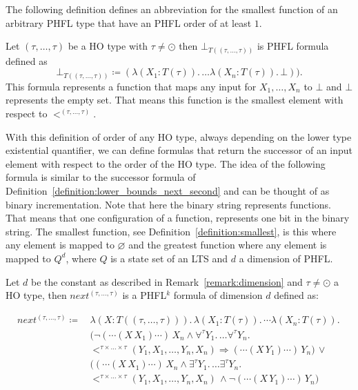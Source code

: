 The following definition defines an abbreviation for the smallest function of an arbitrary PHFL type that have an PHFL order of at least $1$.

\begin{definition} 
\label{definition:smallest}
	Let $(\tau, \dots, \tau)$ be a HO type with $\tau \neq \odot$ then $\bot_{T((\tau, \dots, \tau))}$ is PHFL formula defined as
	\[\bot_{T((\tau, \dots, \tau))} \coloneqq (\lambda (X_1 \colon T(\tau)).\, \dots \lambda (X_n \colon T(\tau)).\,\bot)).\] 
    This formula represents a function that maps any input for $X_1, \dots, X_n$ to $\bot$ and $\bot$ 
    represents the empty set. That means this function is the smallest element with respect to $<^{(\tau, \dots, \tau)}$.
\end{definition}

With this definition of order of any HO type, always depending on the lower type existential quantifier, we can define
formulas that return the successor of an input element with respect to the order of the HO type. The idea of the
following formula is similar to the successor formula of Definition~\ref{definition:lower_bounds_next_second} and can be thought of as binary incrementation. Note that here the binary string represents functions. That means that one configuration of a function, represents one bit in the binary string. The smallest function, see Definition~\ref{definition:smallest}, is this where any element is mapped to $\varnothing$ and the greatest function where any element is mapped to $Q^d$, where $Q$ is a state set of an LTS and $d$ a dimension of PHFL. 

\begin{definition}
    \label{definition:lower_bounds_next_higher}
    Let $d$ be the constant as described in Remark~\ref{remark:dimension} and $\tau \neq \odot$ a
    HO type, then $next^{(\tau, \dots, \tau)}$ is a PHFL$^k$ formula of dimension $d$ defined as:

    \begin{align*}
        next^{(\tau, \dots, \tau)} \coloneqq &\,\lambda (X \colon T ((\tau, \dots, \tau))).\,\lambda (X_1 \colon T(\tau)).\, \dotsb \lambda (X_n \colon T(\tau)).\, \\&\,
        \big(\neg (\dotsb(X\,X_1)\dotsb)\,X_n \wedge \forall^{\tau}Y_1.\, \dots \forall^{\tau}Y_n.\,\\&\,<^{\tau \times
        \dots \times \tau}(Y_1, X_1, \dots, Y_n, X_n) \Rightarrow  (\dotsb(X\,Y_1)\dotsb)\,Y_n\big) \,\vee
        \\&\,\big((\dotsb (X\,X_1) \dotsb)\,X_n \wedge \exists^{\tau}Y_1.\, \dots \exists^{\tau}Y_n.\, \\&\,
        <^{\tau \times \dots \times \tau}
        (Y_1, X_1, \dots, Y_n, X_n)\,\wedge \neg (\dotsb(X\,Y_1)\dotsb)\,Y_n\big)
    \end{align*}
\end{definition}


